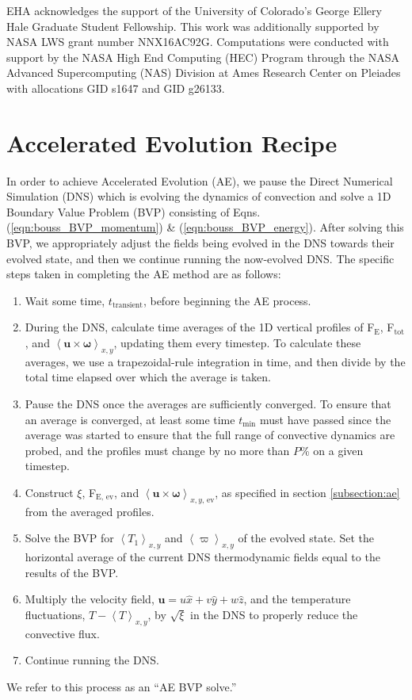 \documentclass[aps, pre, onecolumn, nofootinbib, notitlepage, groupedaddress, amsfonts, amssymb, amsmath, longbibliography]{revtex4-1}
\newcommand{\angles}[1]{\ensuremath{\left\langle #1 \right\rangle}}
\begin{document}
\begin{acknowledgments}
EHA acknowledges the support of the University of Colorado's George 
Ellery Hale Graduate Student Fellowship.
This work was additionally supported by  NASA LWS grant number NNX16AC92G.  
Computations were conducted 
with support by the NASA High End Computing (HEC) Program through the NASA 
Advanced Supercomputing (NAS) Division at Ames Research Center on Pleiades
with allocations GID s1647 and GID g26133.
\end{acknowledgments}


\appendix
\section{Accelerated Evolution Recipe}
\label{appendix:recipe}
In order to achieve Accelerated Evolution (AE), we pause the Direct Numerical Simulation (DNS)
which is evolving the dynamics of convection and solve a 1D Boundary Value Problem (BVP)
consisting of Eqns. (\ref{eqn:bouss_BVP_momentum}) \& (\ref{eqn:bouss_BVP_energy}).
After solving this BVP, we appropriately adjust the fields being evolved in the DNS
towards their evolved state, and then we continue running the now-evolved DNS.
The specific steps taken in completing the AE method are as follows:
\begin{enumerate}
\item Wait some time, $t_{\text{transient}}$, before beginning the AE process.
\item During the DNS, calculate time averages of the 1D vertical profiles of
F$_{\text{E}}$, F$_{\text{tot}}$, 
and $\angles{\bm{u} \times \bm{\omega}}_{x,y}$, updating them every timestep.  
To calculate these
averages, we use a trapezoidal-rule integration in time, and then divide by the
total time elapsed over which the average is taken. 
\item Pause the DNS once the averages are sufficiently converged. 
To ensure that an average is converged, at
least some time $t_{\text{min}}$ must have passed since the average was started to
ensure that the full range of convective dynamics are probed, and
the profiles must change by no more than $P$\% on a given timestep.
\item Construct $\xi$, F$_{\text{E, ev}}$, and $\angles{\bm{u} \times \bm{\omega}}_{x,y\text{, ev}}$,
as specified in section \ref{subsection:ae}
from the averaged profiles.
\item Solve the BVP for $\angles{T_1}_{x,y}$ and $\angles{\varpi}_{x,y}$ of the
evolved state.  Set the horizontal average of the current DNS thermodynamic fields
equal to the results of the BVP.
\item Multiply the velocity field, $\bm{u} = u\hat{x} + v\hat{y} + w\hat{z}$,
and the temperature fluctuations, $T - \angles{T}_{x,y}$,
by $\sqrt{\xi}$ in the DNS to properly reduce the convective flux.
\item Continue running the DNS.
\end{enumerate}
We refer to this process as an ``AE BVP solve.''
\end{document}

